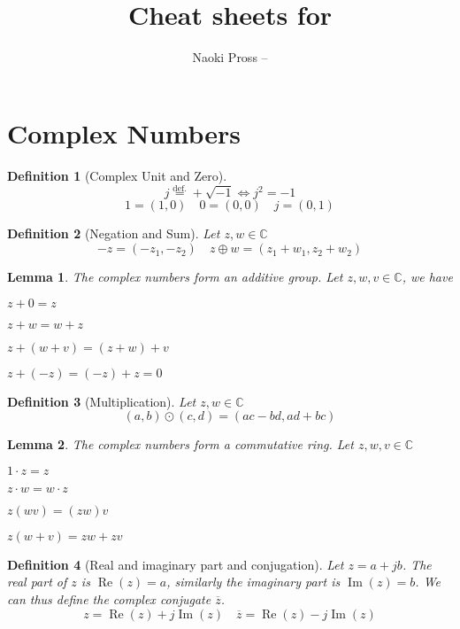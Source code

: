 \documentclass[twocolumn, margin=normal]{tex/hsrzf}
\author{Naoki Pross -- \texttt{\theauthoremail}}
\title{Cheat sheets for \texttt{\themodule}}
\date{\thesemester}
\newcommand\defeq{\overset{\mathrm{def.}}{=}}
\newcommand\Cset{\mathbb{C}}
\newcommand\conj[1]{\overline{#1}}
\renewcommand\Re{\operatorname{Re}}
\renewcommand\Im{\operatorname{Im}}
\theoremstyle{komfourzf}
\newtheorem{definition}{Definition}
\newtheorem{lemma}{Lemma}
\begin{document}
\section{Complex Numbers}

\begin{definition}[Complex Unit and Zero]
  \[
    j \defeq +\sqrt{-1} \iff j^2 = -1
  \]
  \[
    1 = (1,0) \quad 0 = (0,0) \quad j = (0,1)
  \]
\end{definition}

\begin{definition}[Negation and Sum] Let \(z, w \in \Cset\)
\[
  -z = (-z_1, -z_2) \quad
  z \oplus w =  (z_1 + w_1, z_2 + w_2)
\]
\end{definition}

\begin{lemma}
  The complex numbers form an additive group. Let \(z, w, v \in \Cset\), we have
  \begin{description}[leftmargin=3cm]
    \item[Identity] \(z + 0 = z\)
    \item[Commutativity] \(z + w = w + z\)
    \item[Associativity] \(z + (w + v) = (z + w) + v\)
    \item[Inverse property] \(z + (-z) = (-z) + z = 0\)
  \end{description}
\end{lemma}

\begin{definition}[Multiplication] Let \(z, w \in \Cset\)
  \[
    (a,b) \odot (c,d) = (ac - bd, ad + bc)
  \]
\end{definition}

\begin{lemma} The complex numbers form a commutative ring. Let \(z,w,v \in\Cset\)
  \begin{description}[leftmargin=3cm]
    \item[Identity] \(1\cdot z = z\)
    \item[Commutativity] \(z \cdot w = w \cdot z\)
    \item[Associativity] \(z (w v) = (z w) v\)
    \item[Distributivity] \(z (w + v) = zw + zv\)
  \end{description}
\end{lemma}

\begin{definition}[Real and imaginary part and conjugation]
  Let \(z = a + jb\). The \emph{real} part of \(z\) is \(\Re(z) = a\), similarly the \emph{imaginary} part is \(\Im(z) = b\). We can thus define the \emph{complex conjugate} \(\conj{z}\).
  \[
    z = \Re(z) + j\Im(z)
    \quad
    \conj{z} = \Re(z) - j\Im(z)
  \]
\end{definition}
\end{document}
